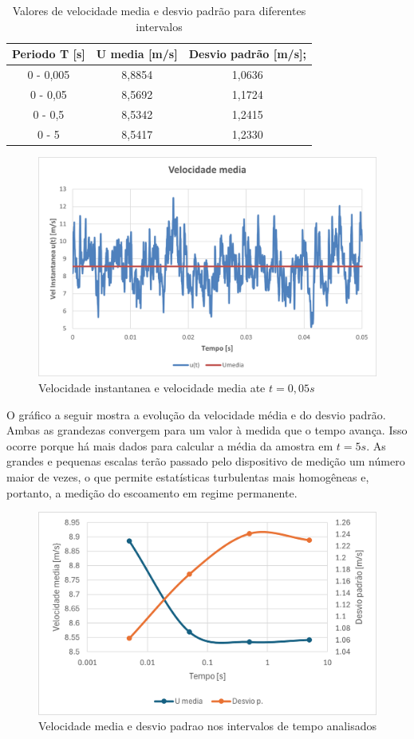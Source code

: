 \documentclass[12pt]{article}
\begin{document}
\begin{table}[h]
	\centering
	\begin{tabular}{|c|c|c|}
		\hline
		Periodo T [s] & U media [m/s] & Desvio padrão [m/s]; \\ \hline
		0 - 0,005   & 8,8854    & 1,0636    \\ \hline
		0 - 0,05   & 8,5692   & 1,1724  \\ \hline
		0 - 0,5    & 8,5342    & 1,2415    \\ \hline
		0 - 5    & 8,5417    & 1,2330   \\ \hline
	\end{tabular}
	\caption{Valores de velocidade media e desvio padrão para diferentes intervalos}
\end{table} 

\begin{figure}[H]
	\centering
	\includegraphics[width=.65\textwidth]{Figures/1.PNG}
	\caption{Velocidade instantanea e velocidade media ate $t=0,05s$}
\end{figure}

O gráfico a seguir mostra a evolução da velocidade média e do desvio padrão. Ambas as grandezas convergem para um valor à medida que o tempo avança. Isso ocorre porque há mais dados para calcular a média da amostra em $t=5s$. As grandes e pequenas escalas terão passado pelo dispositivo de medição um número maior de vezes, o que permite estatísticas turbulentas mais homogêneas e, portanto, a medição do escoamento em regime permanente.

\begin{figure}[H]
	\centering
	\includegraphics[width=.65\textwidth]{Figures/2.PNG}
	\caption{Velocidade media e desvio padrao nos intervalos de tempo analisados}
\end{figure}
\end{document}
